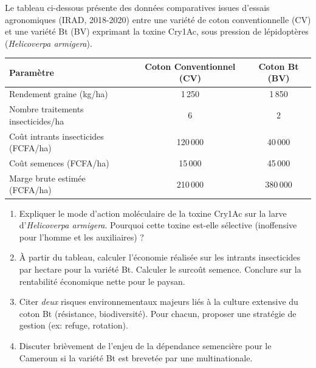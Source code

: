 \documentclass[11pt]{article}
\begin{document}
\begin{exercice}
Le tableau ci-dessous présente des données comparatives issues d'essais agronomiques (IRAD, 2018-2020) entre une variété de coton conventionnelle (CV) et une variété Bt (BV) exprimant la toxine Cry1Ac, sous pression de lépidoptères (\textit{Helicoverpa armigera}).
\begin{center}
\begin{tabular}{|l|c|c|}
\hline
\textbf{Paramètre} & \textbf{Coton Conventionnel (CV)} & \textbf{Coton Bt (BV)} \\
\hline
Rendement graine (kg/ha) & 1\,250 & 1\,850 \\
Nombre traitements insecticides/ha & 6 & 2 \\
Coût intrants insecticides (FCFA/ha) & 120\,000 & 40\,000 \\
Coût semences (FCFA/ha) & 15\,000 & 45\,000 \\
Marge brute estimée (FCFA/ha) & 210\,000 & 380\,000 \\
\hline
\end{tabular}
\end{center}
\begin{enumerate}
    \item Expliquer le mode d'action moléculaire de la toxine Cry1Ac sur la larve d'\textit{Helicoverpa armigera}. Pourquoi cette toxine est-elle sélective (inoffensive pour l'homme et les auxiliaires) ?
    \item À partir du tableau, calculer l'économie réalisée sur les intrants insecticides par hectare pour la variété Bt. Calculer le surcoût semence. Conclure sur la rentabilité économique nette pour le paysan.
    \item Citer \textit{deux} risques environnementaux majeurs liés à la culture extensive du coton Bt (résistance, biodiversité). Pour chacun, proposer une stratégie de gestion (ex: refuge, rotation).
    \item Discuter brièvement de l'enjeu de la dépendance semencière pour le Cameroun si la variété Bt est brevetée par une multinationale.
\end{enumerate}
\end{exercice}
\end{document}
